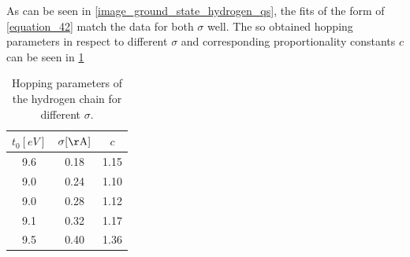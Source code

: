 As can be seen in \cref{image_ground_state_hydrogen_qs}, the fits of the form of \cref{equation_42} match the data for both $\sigma$ well. The so obtained hopping parameters in respect to different $\sigma$ and corresponding proportionality constants $c$ can be seen in \cref{table_hopping}
\begin{table}[!h]
\centering
\begin{tabular}{c|c|c}
$t_0 [\unit{eV}]$ & $\sigma [\unit{\AA}]$ & $c$\\
\hline \hline
9.6&0.18&1.15\\
9.0&0.24&1.10\\
9.0&0.28&1.12\\
9.1&0.32&1.17\\
9.5&0.40&1.36\\
\end{tabular}
\caption{Hopping parameters of the hydrogen chain for different $\sigma$.}
\label{table_hopping}
\end{table}\\

